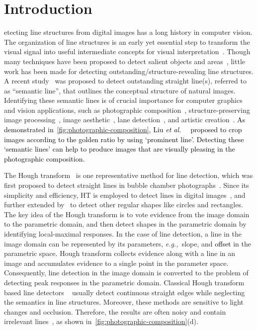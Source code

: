 \documentclass[10pt,journal,cspaper,compsoc]{IEEEtran}
\newcommand{\revise}[1]{{\textcolor{black}{#1}}}
\def\etal{\emph{et al.~}}
\def\eg{\emph{e.g.,~}}
\begin{document}
\section{Introduction}\label{sec:introduction}

etecting line structures from digital images has 
a long history in computer vision.
The organization of line structures is an early yet essential step to transform the visual signal into useful intermediate concepts 
for visual interpretation~\cite{burns1986extracting}.
Though many techniques have been proposed to detect salient objects
\cite{zhao2019optimizing,HouPami19Dss,gao2020sod100k,BorjiCVM2019,wang2021revisiting}
and areas~\cite{cheng2015global,zhu2014saliency,Fan2020S4Net},
little work has been made for detecting outstanding/structure-revealing line structures.
A recent study~\cite{lee2017semantic} was proposed to detect outstanding straight line(s),
referred to as ``semantic line'', that outlines the conceptual structure of natural images.
Identifying these semantic lines is of crucial importance for 
computer graphics and vision applications, such as 
photographic composition~\cite{liu2010optimizing,freeman2007photographer},
structure-preserving image processing~\cite{TIP20_SP_NPR,hu2013patchnet},
image aesthetic~\cite{ko2018pac,lee2019property,kong2016photo,mai2016composition},
lane detection~\cite{fan2019spinnet},
and artistic creation~\cite{krages2012photography,hu2013inverse,chen2009sketch2photo,zhang2020and}.
\revise{
  As demonstrated in~\cref{fig:photographic-composition}, 
Liu \etal~\cite{liu2010optimizing} proposed to crop images according 
to the golden ratio by using `prominent line'.
Detecting these `semantic lines' can help to produce images that
are visually pleasing in the photographic composition.
}


The Hough transform~\cite{duda1971use,ballard1981generating} is one 
representative method for line detection,
which was first proposed to detect straight lines in bubble chamber 
photographs~\cite{hough1962method}.
Since its simplicity and efficiency, 
HT is employed to detect lines in digital images~\cite{duda1971use},
and further extended by~\cite{ballard1981generating} to detect other regular shapes like circles and rectangles.
The key idea of the Hough transform is to vote evidence from the image domain to the parametric domain, and
then detect shapes in the parametric domain by identifying local-maximal responses.
In the case of line detection, a line in the image domain can be represented 
by its parameters, \eg slope, and \revise{offset} in the parametric space.
Hough transform collects evidence along with a line in an image
and accumulates evidence to a single point in the parameter space.
Consequently, line detection in the image domain is converted to the problem of detecting peak responses in the
parametric domain.
Classical Hough transform based line detectors
~\cite{fernandes2008real,yacoub1995hierarchical,princen1990hierarchical,kiryati1991probabilistic}
usually detect continuous straight edges while neglecting the semantics in line structures.
Moreover, these methods are sensitive to light changes and occlusion.
Therefore, the results are often noisy and contain irrelevant lines~\cite{akinlar2011edlines},
as shown in~\cref{fig:photographic-composition}(d).
\end{document}
